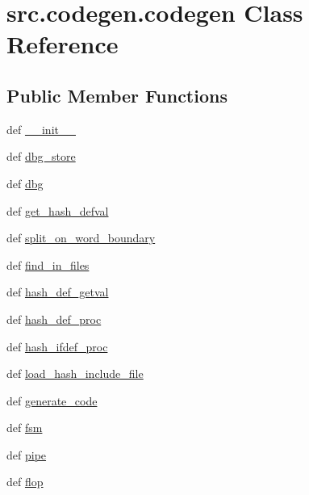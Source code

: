 \hypertarget{classsrc_1_1codegen_1_1codegen}{\section{src.\-codegen.\-codegen Class Reference}
\label{classsrc_1_1codegen_1_1codegen}
}
\subsection*{Public Member Functions}
\begin{DoxyCompactItemize}
\item 
def \hyperlink{classsrc_1_1codegen_1_1codegen_a398aadb5efcb770f3a620377176f30e8}{\-\_\-\-\_\-init\-\_\-\-\_\-}
\item 
def \hyperlink{classsrc_1_1codegen_1_1codegen_a8c0c108747245b54d7db81573b81dceb}{dbg\-\_\-store}
\item 
def \hyperlink{classsrc_1_1codegen_1_1codegen_a60ca6e690218d7156d86b764bbb610a4}{dbg}
\item 
def \hyperlink{classsrc_1_1codegen_1_1codegen_a44f570694e36b5ea23f568e01496623c}{get\-\_\-hash\-\_\-defval}
\item 
def \hyperlink{classsrc_1_1codegen_1_1codegen_a32c2b7a8fa27ff898939f71249f3226a}{split\-\_\-on\-\_\-word\-\_\-boundary}
\item 
def \hyperlink{classsrc_1_1codegen_1_1codegen_abdabc0d5fbdb726bcf0aa04efaf7e1b9}{find\-\_\-in\-\_\-files}
\item 
def \hyperlink{classsrc_1_1codegen_1_1codegen_ad1009199bc34ca1ebdee4724aaa4e9f5}{hash\-\_\-def\-\_\-getval}
\item 
def \hyperlink{classsrc_1_1codegen_1_1codegen_afee64e2ab5666640bdb2f9646b17ec06}{hash\-\_\-def\-\_\-proc}
\item 
def \hyperlink{classsrc_1_1codegen_1_1codegen_aed488c2ca235a59f579579f10e6ae427}{hash\-\_\-ifdef\-\_\-proc}
\item 
def \hyperlink{classsrc_1_1codegen_1_1codegen_a60aaf97546f41a1f135ef50cf1554df9}{load\-\_\-hash\-\_\-include\-\_\-file}
\item 
def \hyperlink{classsrc_1_1codegen_1_1codegen_a1407f81e5ffd9c6d084791bc865efad8}{generate\-\_\-code}
\item 
def \hyperlink{classsrc_1_1codegen_1_1codegen_af5b1063b6e2fc66994261e2a33cfeb14}{fsm}
\item 
def \hyperlink{classsrc_1_1codegen_1_1codegen_a53e8215ac19c4923e57f2a5dc40f127d}{pipe}
\item 
def \hyperlink{classsrc_1_1codegen_1_1codegen_acea965b006a0586d8da7aa4ab53081ea}{flop}
\end{DoxyCompactItemize}
